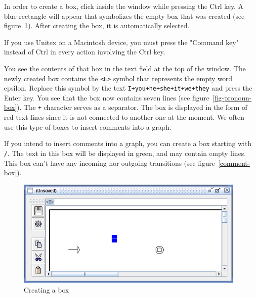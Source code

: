 \bigskip
\noindent In order to create a box, click inside the window while pressing the Ctrl
key.
A blue rectangle will appear that symbolizes the empty box that was created (see
figure~\ref{fig-box-creation}). After creating the box, it is automatically selected. 


\noindent If you use Unitex on a Macintosh device, you must press the "Command key" 
instead of Ctrl in every action involving the Ctrl key.

\bigskip
\noindent You see the contents of that box in the text field at the top of the
window. The newly created box contains the \verb+<E>+ symbol that represents the empty word
epsilon. Replace this symbol by the text \verb$I+you+he+she+it+we+they$ and
press the Enter key. You see that the box now contains seven lines (see
figure~\ref{fig-pronoun-box}). The \verb$+$ character serves as a
separator.\index{\verb$+$} The box is displayed in the form of red text lines since it is 
not connected to another one at the moment.
We often use this type of boxes to insert comments into a
graph. 

\bigskip
\noindent If you intend to insert comments into a graph, you can create a box starting with \verb$/$.
The text in this box will be displayed in green, and may contain empty lines.
This box can't have any incoming nor outgoing transitions (see
figure~\ref{comment-box}).

\begin{figure}[!hb]
\begin{center}
\includegraphics[width=14.5cm]{resources/img/fig5-3.png}
\caption{Creating a box\label{fig-box-creation}}
\end{center}
\end{figure}


